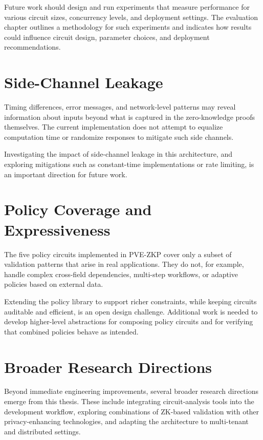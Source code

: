 Future work should design and run experiments that measure performance for
various circuit sizes, concurrency levels, and deployment settings. The
evaluation chapter outlines a methodology for such experiments and indicates
how results could influence circuit design, parameter choices, and deployment
recommendations.

\section{Side-Channel Leakage}

Timing differences, error messages, and network-level patterns may reveal
information about inputs beyond what is captured in the zero-knowledge proofs
themselves. The current implementation does not attempt to equalize computation
time or randomize responses to mitigate such side channels.

Investigating the impact of side-channel leakage in this architecture, and
exploring mitigations such as constant-time implementations or rate limiting,
is an important direction for future work.

\section{Policy Coverage and Expressiveness}

The five policy circuits implemented in PVE-ZKP cover only a subset of
validation patterns that arise in real applications. They do not, for example,
handle complex cross-field dependencies, multi-step workflows, or adaptive
policies based on external data.

Extending the policy library to support richer constraints, while keeping
circuits auditable and efficient, is an open design challenge. Additional work
is needed to develop higher-level abstractions for composing policy circuits
and for verifying that combined policies behave as intended.

\section{Broader Research Directions}

Beyond immediate engineering improvements, several broader research directions
emerge from this thesis. These include integrating circuit-analysis tools into
the development workflow, exploring combinations of ZK-based validation with
other privacy-enhancing technologies, and adapting the architecture to
multi-tenant and distributed settings.
